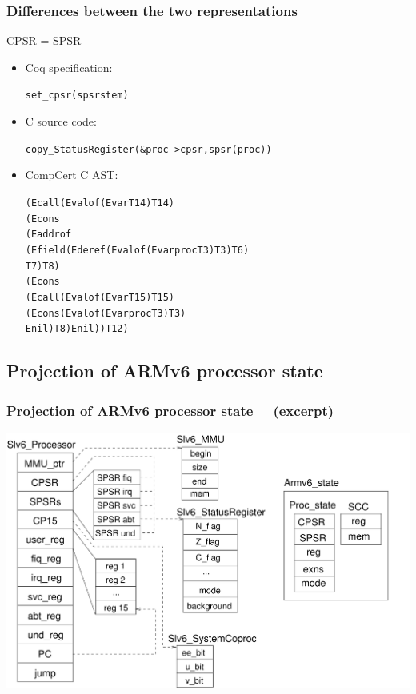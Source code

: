 \documentclass[usenames,dvipsnames]{beamer} %
\begin{document}
\begin{frame}[fragile]
\frametitle{Differences between the two representations}
\begin{block}{CPSR = SPSR}
\begin{itemize}
\item Coq specification:
\begin{alltt}
set_cpsr (spsr st em)
\end{alltt}
\item C source code: 
\begin{alltt}
copy_StatusRegister(&proc->cpsr, spsr(proc))
\end{alltt}
\item CompCert C AST:
\begin{alltt}\small
(Ecall (Evalof (Evar  T14) T14)
  (Econs
    (Eaddrof
       (Efield (Ederef (Evalof (Evar proc T3) T3) T6) 
                T7) T8)
          (Econs
             (Ecall (Evalof (Evar  T15) T15)
                (Econs (Evalof (Evar proc T3) T3) 
                 Enil) T8) Enil)) T12)
\end{alltt}
\end{itemize}
\end{block}
\end{frame}

\subsection{Projection of ARMv6 processor state}
\begin{frame}
\frametitle{Projection of ARMv6 processor state ~~(excerpt)}
\hfil\includegraphics[width=1.01\linewidth]{fig/projection1.pdf}
\end{frame}
\end{document}

